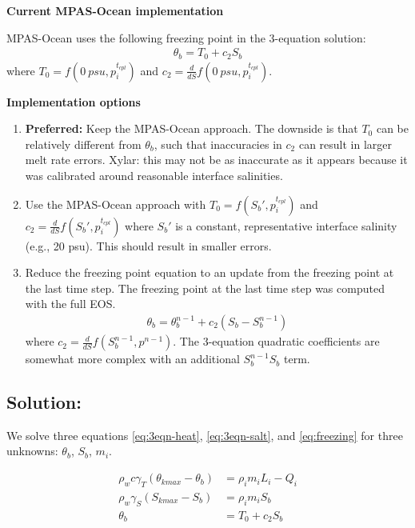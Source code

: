 \documentclass[11pt]{report}
\newcommand{\bea}{\begin{eqnarray}}
\newcommand{\eea}{\end{eqnarray}}
\begin{document}

\textbf{Current MPAS-Ocean implementation}

MPAS-Ocean uses the following freezing point in the 3-equation solution:
\bea
    \theta_b = T_0 + c_2 S_b
\eea
where $T_0 = f(0\:psu, p_i^{t_{cpl}})$ and $c_2 = \frac{d}{dS} f(0\:psu, p_i^{t_{cpl}})$.

\textbf{Implementation options}

\begin{enumerate}
    \item \textbf{Preferred:} Keep the MPAS-Ocean approach. The downside is that $T_0$ can be relatively different from $\theta_b$, such that inaccuracies in $c_2$ can result in larger melt rate errors. Xylar: this may not be as inaccurate as it appears because it was calibrated around reasonable interface salinities.
    \item Use the MPAS-Ocean approach with $T_0 = f(S_b', p_i^{t_{cpl}})$ and $c_2 = \frac{d}{dS} f(S_b', p_i^{t_{cpl}})$ where $S_b'$ is a constant, representative interface salinity (e.g., 20 psu). This should result in smaller errors.
    \item Reduce the freezing point equation to an update from the freezing point at the last time step. The freezing point at the last time step was computed with the full EOS.
    \bea
        \theta_b = \theta_b^{n-1} + c_2(S_b - S_b^{n-1})
    \eea
    where $c_2 = \frac{d}{dS} f(S_b^{n-1}, p^{n-1})$. The 3-equation quadratic coefficients are somewhat more complex with an additional $S_b^{n-1} S_b$ term.
\end{enumerate}

\subsection{Solution:}
We solve three equations \ref{eq:3eqn-heat}, \ref{eq:3eqn-salt}, and \ref{eq:freezing} for three unknowns: $\theta_b$, $S_b$, $m_i$.

\begin{align}
\rho_w c \gamma_T (\theta_{kmax} - \theta_b) &= \rho_i m_i L_i - Q_i \label{eq:melt1} \\
\rho_w \gamma_S (S_{kmax} - S_b) &= \rho_i m_i S_b \label{eq:melt2} \\
\theta_b &= T_0 + c_2 S_b  \label{eq:melt3}
\end{align}
\end{document}
